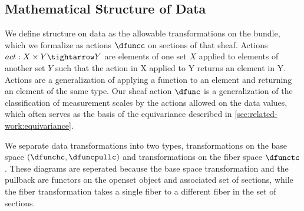 \documentclass[10pt,journal,compsoc]{IEEEtran}
\theoremstyle{definition}
\theoremstyle{remark}
\begin{document}
\subsection{Mathematical Structure of Data}
\label{sec:atct:sheaves:measurments}
We define structure on data as the allowable \textcolor{action}{transformations on the bundle}, which we formalize as actions $\dfuncc$ on sections of that sheaf. Actions  $act: X \times Y \tightarrow Y$ are elements of one set $X$ applied to elements of another set $Y$ such that the action in X applied to Y returns an element in Y\cite{nlab:action}. Actions are a generalization of applying a function to an element and returning an element of the same type. Our sheaf action  $\dfunc$ is a generalization of the classification of measurement scales by the actions allowed on the data values\cite{stevensTheoryScalesMeasurement1946,leaFormalizationMeasurementScale, thomasMathematizationNotMeasurement2014}, which often serves as the basis of the equivariance described in \autoref{sec:related-work:equivariance}.

We separate data transformations into two types, transformations on the base space $(\dfunchc, \dfuncpullc)$ and transformations on the fiber space $\dfunctc$. These diagrams are seperated because the base space transformation and the pullback are functors on the openset object and associated set of sections, while the fiber transformation takes a single fiber to a different fiber in the set of sections. 
\end{document}
